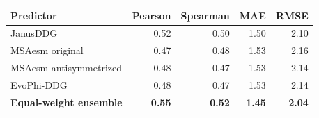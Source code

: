 \begin{tabular}{lrrrr}\toprule Predictor & Pearson & Spearman & MAE & RMSE\\\midrule
JanusDDG & 0.52 & 0.50 & 1.50 & 2.10 \\
MSAesm original & 0.47 & 0.48 & 1.53 & 2.16 \\
MSAesm antisymmetrized & 0.48 & 0.47 & 1.53 & 2.14 \\
EvoPhi-DDG & 0.48 & 0.47 & 1.53 & 2.14 \\
\textbf{Equal-weight ensemble} & \textbf{0.55} & \textbf{0.52} & \textbf{1.45} & \textbf{2.04} \\
\bottomrule\end{tabular}
